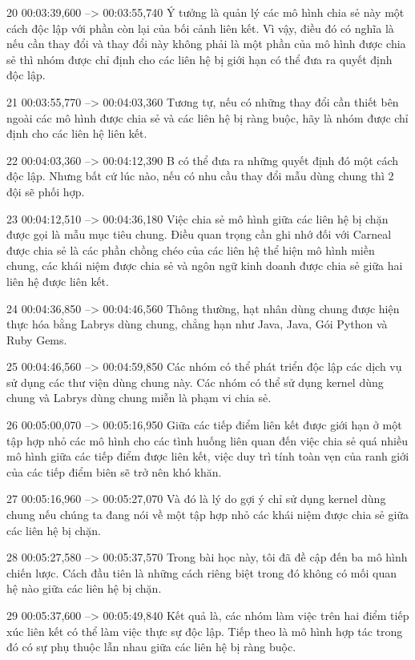 20
00:03:39,600 --> 00:03:55,740
Ý tưởng là quản lý các mô hình chia sẻ này một cách độc lập với phần còn lại của bối cảnh liên kết.  Vì vậy, điều đó có nghĩa là nếu cần thay đổi và thay đổi này không phải là một phần của mô hình được chia sẻ thì nhóm được chỉ định cho các liên hệ bị giới hạn có thể đưa ra quyết định độc lập.

21
00:03:55,770 --> 00:04:03,360
Tương tự, nếu có những thay đổi cần thiết bên ngoài các mô hình được chia sẻ và các liên hệ bị ràng buộc, hãy là nhóm được chỉ định cho các liên hệ liên kết.

22
00:04:03,360 --> 00:04:12,390
B có thể đưa ra những quyết định đó một cách độc lập.  Nhưng bất cứ lúc nào, nếu có nhu cầu thay đổi mẫu dùng chung thì 2 đội sẽ phối hợp.

23
00:04:12,510 --> 00:04:36,180
Việc chia sẻ mô hình giữa các liên hệ bị chặn được gọi là mẫu mục tiêu chung.  Điều quan trọng cần ghi nhớ đối với Carneal được chia sẻ là các phần chồng chéo của các liên hệ thể hiện mô hình miền chung, các khái niệm được chia sẻ và ngôn ngữ kinh doanh được chia sẻ giữa hai liên hệ được liên kết.

24
00:04:36,850 --> 00:04:46,560
Thông thường, hạt nhân dùng chung được hiện thực hóa bằng Labrys dùng chung, chẳng hạn như Java, Java, Gói Python và Ruby Gems.

25
00:04:46,560 --> 00:04:59,850
Các nhóm có thể phát triển độc lập các dịch vụ sử dụng các thư viện dùng chung này.  Các nhóm có thể sử dụng kernel dùng chung và Labrys dùng chung miễn là phạm vi chia sẻ.

26
00:05:00,070 --> 00:05:16,950
Giữa các tiếp điểm liên kết được giới hạn ở một tập hợp nhỏ các mô hình cho các tình huống liên quan đến việc chia sẻ quá nhiều mô hình giữa các tiếp điểm được liên kết, việc duy trì tính toàn vẹn của ranh giới của các tiếp điểm biên sẽ trở nên khó khăn.

27
00:05:16,960 --> 00:05:27,070
Và đó là lý do gợi ý chỉ sử dụng kernel dùng chung nếu chúng ta đang nói về một tập hợp nhỏ các khái niệm được chia sẻ giữa các liên hệ bị chặn.

28
00:05:27,580 --> 00:05:37,570
Trong bài học này, tôi đã đề cập đến ba mô hình chiến lược.  Cách đầu tiên là những cách riêng biệt trong đó không có mối quan hệ nào giữa các liên hệ bị chặn.

29
00:05:37,600 --> 00:05:49,840
Kết quả là, các nhóm làm việc trên hai điểm tiếp xúc liên kết có thể làm việc thực sự độc lập.  Tiếp theo là mô hình hợp tác trong đó có sự phụ thuộc lẫn nhau giữa các liên hệ bị ràng buộc.

